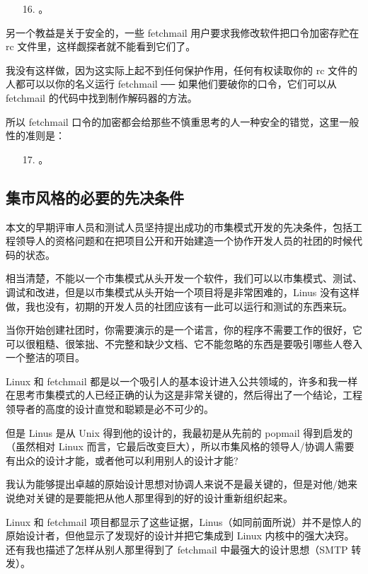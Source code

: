 \begin{enumerate}
\item[16.] 。
\end{enumerate}

另一个教益是关于安全的，一些 fetchmail 用户要求我修改软件把口令加密存贮在 rc 文件里，这样觑探者就不能看到它们了。


我没有这样做，因为这实际上起不到任何保护作用，任何有权读取你的 rc 文件的人都可以以你的名义运行 fetchmail ── 如果他们要破你的口令，它们可以从 fetchmail 的代码中找到制作解码器的方法。


所以 fetchmail 口令的加密都会给那些不慎重思考的人一种安全的错觉，这里一般性的准则是：

\begin{enumerate}
\item[17.] 。
\end{enumerate}

\subsection{集市风格的必要的先决条件}


本文的早期评审人员和测试人员坚持提出成功的市集模式开发的先决条件，包括工程领导人的资格问题和在把项目公开和开始建造一个协作开发人员的社团的时候代码的状态。


相当清楚，不能以一个市集模式从头开发一个软件，我们可以以市集模式、测试、调试和改进，但是以市集模式从头开始一个项目将是非常困难的，Linus 没有这样做，我也没有，初期的开发人员的社团应该有一此可以运行和测试的东西来玩。


当你开始创建社团时，你需要演示的是一个诺言，你的程序不需要工作的很好，它可以很粗糙、很笨拙、不完整和缺少文档、它不能忽略的东西是要吸引哪些人卷入一个整洁的项目。


Linux 和 fetchmail 都是以一个吸引人的基本设计进入公共领域的，许多和我一样在思考市集模式的人已经正确的认为这是非常关键的，然后得出了一个结论，工程领导者的高度的设计直觉和聪颖是必不可少的。


但是 Linus 是从 Unix 得到他的设计的，我最初是从先前的 popmail 得到启发的（虽然相对 Linux 而言，它最后改变巨大），所以市集风格的领导人/协调人需要有出众的设计才能，或者他可以利用别人的设计才能?


我认为能够提出卓越的原始设计思想对协调人来说不是最关键的，但是对他/她来说绝对关键的是要能把从他人那里得到的好的设计重新组织起来。


Linux 和 fetchmail 项目都显示了这些证据，Linus（如同前面所说）并不是惊人的原始设计者，但他显示了发现好的设计并把它集成到 Linux 内核中的强大决窍。还有我也描述了怎样从别人那里得到了 fetchmail 中最强大的设计思想（SMTP 转发）。


